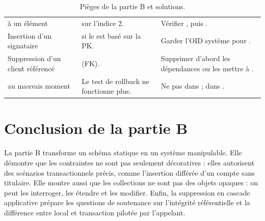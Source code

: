 \begin{table}[htbp]
  \centering
  \small
  \caption{Pièges de la partie B et solutions.}
  \label{tab:pieges-partieB}
  \begin{tabularx}{\textwidth}{@{}L{5.0cm}L{4.8cm}X@{}}
    \toprule
     &  &  \\
    \midrule
     à un élément &
     sur l'indice 2. &
    Vérifier , puis . \\
    Insertion d'un signataire &
     si le  est basé sur la PK. &
    Garder l'OID système pour . \\
    Suppression d'un client référencé &
     (FK). &
    Supprimer d'abord les dépendances ou les mettre à . \\
     au mauvais moment &
    Le test de rollback ne fonctionne plus. &
    Ne pas  dans  ;  dans
    . \\
    \bottomrule
  \end{tabularx}
\end{table}

\section{Conclusion de la partie B}

La partie B transforme un schéma statique en un système manipulable. Elle
démontre que les contraintes ne sont pas seulement décoratives : elles
autorisent des scénarios transactionnels précis, comme l'insertion différée
d'un compte sans titulaire. Elle montre aussi que les collections ne sont pas
des objets opaques : on peut les interroger, les étendre et les modifier. Enfin,
la suppression en cascade applicative prépare les questions de soutenance sur
l'intégrité référentielle et la différence entre  local et
transaction pilotée par l'appelant.
